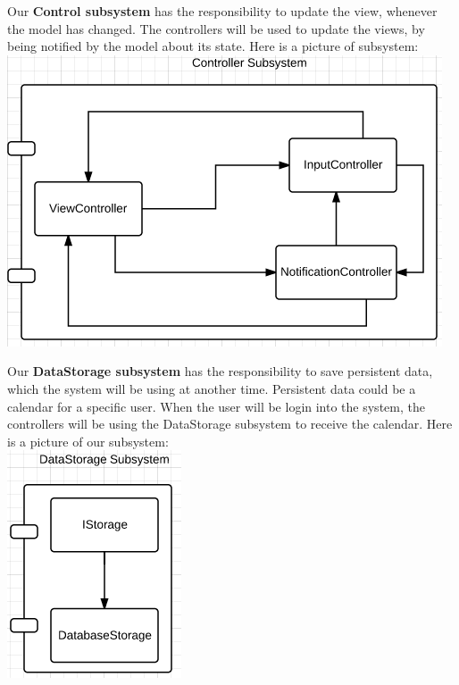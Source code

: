 Our \textbf{Control subsystem} has the responsibility to update the view, whenever the model has changed. The controllers will be used to update the views, by being notified by the model about its state. Here is a picture of subsystem:\\
\includegraphics[scale=0.8]{controlSubsystem}

\pagebreak

Our \textbf{DataStorage subsystem} has the responsibility to save persistent data, which the system will be using at another time. Persistent data could be a calendar for a specific user. When the user will be login into the system, the controllers will be using the DataStorage subsystem to receive the calendar. Here is a picture of our subsystem:\\
\includegraphics[scale=0.8]{datastorageSubsystem}